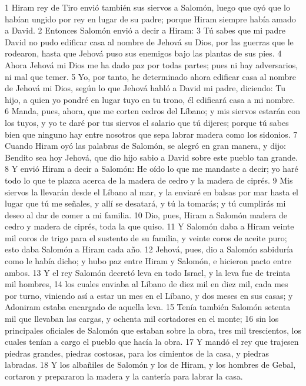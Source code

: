 1 Hiram rey de Tiro envió también sus siervos a Salomón, luego que oyó que lo habían ungido por rey en lugar de su padre; porque Hiram siempre había amado a David.
2 Entonces Salomón envió a decir a Hiram:
3 Tú sabes que mi padre David no pudo edificar casa al nombre de Jehová su Dios, por las guerras que le rodearon, hasta que Jehová puso sus enemigos bajo las plantas de sus pies.
4 Ahora Jehová mi Dios me ha dado paz por todas partes; pues ni hay adversarios, ni mal que temer.
5 Yo, por tanto, he determinado ahora edificar casa al nombre de Jehová mi Dios, según lo que Jehová habló a David mi padre, diciendo: Tu hijo, a quien yo pondré en lugar tuyo en tu trono, él edificará casa a mi nombre. 
6 Manda, pues, ahora, que me corten cedros del Líbano; y mis siervos estarán con los tuyos, y yo te daré por tus siervos el salario que tú dijeres; porque tú sabes bien que ninguno hay entre nosotros que sepa labrar madera como los sidonios.
7 Cuando Hiram oyó las palabras de Salomón, se alegró en gran manera, y dijo: Bendito sea hoy Jehová, que dio hijo sabio a David sobre este pueblo tan grande.
8 Y envió Hiram a decir a Salomón: He oído lo que me mandaste a decir; yo haré todo lo que te plazca acerca de la madera de cedro y la madera de ciprés.
9 Mis siervos la llevarán desde el Líbano al mar, y la enviaré en balsas por mar hasta el lugar que tú me señales, y allí se desatará, y tú la tomarás; y tú cumplirás mi deseo al dar de comer a mi familia.
10 Dio, pues, Hiram a Salomón madera de cedro y madera de ciprés, toda la que quiso.
11 Y Salomón daba a Hiram veinte mil coros   de trigo para el sustento de su familia, y veinte coros de aceite puro; esto daba Salomón a Hiram cada año.
12 Jehová, pues, dio a Salomón sabiduría como le había dicho; y hubo paz entre Hiram y Salomón, e hicieron pacto entre ambos.
13 Y el rey Salomón decretó leva en todo Israel, y la leva fue de treinta mil hombres,
14 los cuales enviaba al Líbano de diez mil en diez mil, cada mes por turno, viniendo así a estar un mes en el Líbano, y dos meses en sus casas; y Adoniram estaba encargado de aquella leva.
15 Tenía también Salomón setenta mil que llevaban las cargas, y ochenta mil cortadores en el monte;
16 sin los principales oficiales de Salomón que estaban sobre la obra, tres mil trescientos, los cuales tenían a cargo el pueblo que hacía la obra.
17 Y mandó el rey que trajesen piedras grandes, piedras costosas, para los cimientos de la casa, y piedras labradas.
18 Y los albañiles de Salomón y los de Hiram, y los hombres de Gebal, cortaron y prepararon la madera y la cantería para labrar la casa.

